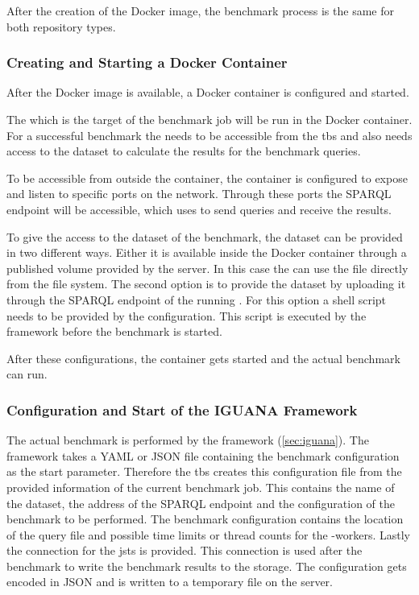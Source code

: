After the creation of the Docker image, the benchmark process is the same for both repository types.


\subsubsection{Creating and Starting a Docker Container}
After the Docker image is available, a Docker container is configured and started.

The \ts{} which is the target of the benchmark job will be run in the Docker container.
For a successful benchmark the \ts{} needs to be accessible from the \ac{tbs} and also needs access to the dataset to calculate the results for the benchmark queries.

To be accessible from outside the container, the container is configured to expose and listen to specific ports on the network.
Through these ports the SPARQL endpoint will be accessible, which \iguana{} uses to send queries and receive the results.

To give the \ts{} access to the dataset of the benchmark, the dataset can be provided in two different ways.
Either it is available inside the Docker container through a published volume provided by the server.
In this case the \ts{} can use the file directly from the file system.
The second option is to provide the dataset by uploading it through the SPARQL endpoint of the running \ts{}.
For this option a shell script needs to be provided by the \ts{} configuration.
This script is executed by the \iguana{} framework before the benchmark is started.

After these configurations, the container gets started and the actual benchmark can run.


\subsubsection{Configuration and Start of the IGUANA Framework}
The actual benchmark is performed by the \iguana{} framework (\ref{sec:iguana}).
The framework takes a YAML or JSON file containing the benchmark configuration as the start parameter.
Therefore the \ac{tbs} creates this configuration file from the provided information of the current benchmark job.
This contains the name of the dataset, the address of the SPARQL endpoint and the configuration of the benchmark to be performed.
The benchmark configuration contains the location of the query file and possible time limits or thread counts for the \iguana{}-workers.
Lastly the connection for the \ac{jsts} is provided.
This connection is used after the benchmark to write the benchmark results to the storage.
The \iguana{} configuration gets encoded in JSON and is written to a temporary file on the server.
\\

